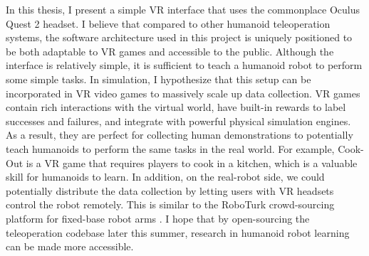 In this thesis, I present a simple VR interface that uses the commonplace Oculus Quest 2 headset. I believe that compared to other humanoid teleoperation systems, the software architecture used in this project is uniquely positioned to be both adaptable to VR games and accessible to the public. Although the interface is relatively simple, it is sufficient to teach a humanoid robot to perform some simple tasks. In simulation, I hypothesize that this setup can be incorporated in VR video games to massively scale up data collection. VR games contain rich interactions with the virtual world, have built-in rewards to label successes and failures, and integrate with powerful physical simulation engines. As a result, they are perfect for collecting human demonstrations to potentially teach humanoids to perform the same tasks in the real world. For example, Cook-Out is a VR game that requires players to cook in a kitchen, which is a valuable skill for humanoids to learn. In addition, on the real-robot side, we could potentially distribute the data collection by letting users with VR headsets control the robot remotely. This is similar to the RoboTurk crowd-sourcing platform for fixed-base robot arms \cite{mandlekar2018roboturk}. I hope that by open-sourcing the teleoperation codebase later this summer, research in humanoid robot learning can be made more accessible. 

